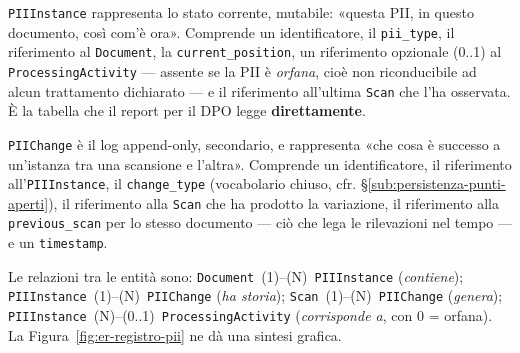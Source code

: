 \texttt{PIIInstance} rappresenta lo stato corrente, mutabile: «questa PII, in questo documento, così com'è ora». Comprende un identificatore, il \texttt{pii\_type}, il riferimento al \texttt{Document}, la \texttt{current\_position}, un riferimento opzionale (0..1) al \texttt{ProcessingActivity} --- assente se la PII è \textit{orfana}, cioè non riconducibile ad alcun trattamento dichiarato --- e il riferimento all'ultima \texttt{Scan} che l'ha osservata. È la tabella che il report per il DPO legge \textbf{direttamente}.

\texttt{PIIChange} è il log append-only, secondario, e rappresenta «che cosa è successo a un'istanza tra una scansione e l'altra». Comprende un identificatore, il riferimento all'\texttt{PIIInstance}, il \texttt{change\_type} (vocabolario chiuso, cfr. §\ref{sub:persistenza-punti-aperti}), il riferimento alla \texttt{Scan} che ha prodotto la variazione, il riferimento alla \texttt{previous\_scan} per lo stesso documento --- ciò che lega le rilevazioni nel tempo --- e un \texttt{timestamp}.

Le relazioni tra le entità sono: \texttt{Document}~(1)--(N)~\texttt{PIIInstance} (\textit{contiene}); \texttt{PIIInstance}~(1)--(N)~\texttt{PIIChange} (\textit{ha storia}); \texttt{Scan}~(1)--(N)~\texttt{PIIChange} (\textit{genera}); \texttt{PIIInstance}~(N)--(0..1)~\texttt{ProcessingActivity} (\textit{corrisponde a}, con 0 = orfana). La Figura~\ref{fig:er-registro-pii} ne dà una sintesi grafica.

